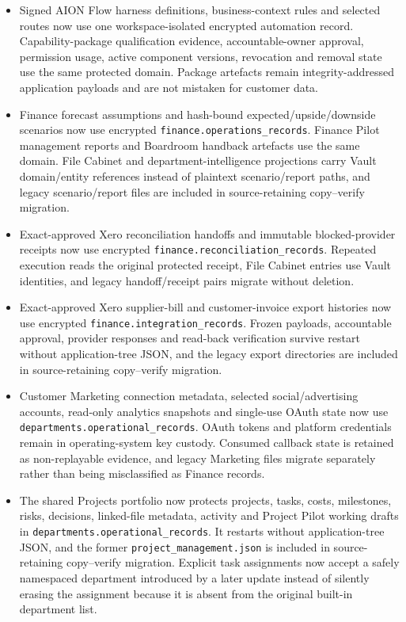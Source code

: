 \documentclass[11pt]{article}
\begin{document}
\begin{itemize}
  \item Signed AION Flow harness definitions, business-context rules and selected routes now use one workspace-isolated encrypted automation record. Capability-package qualification evidence, accountable-owner approval, permission usage, active component versions, revocation and removal state use the same protected domain. Package artefacts remain integrity-addressed application payloads and are not mistaken for customer data.
  \item Finance forecast assumptions and hash-bound expected/upside/downside scenarios now use encrypted \texttt{finance.operations\_records}. Finance Pilot management reports and Boardroom handback artefacts use the same domain. File Cabinet and department-intelligence projections carry Vault domain/entity references instead of plaintext scenario/report paths, and legacy scenario/report files are included in source-retaining copy--verify migration.
  \item Exact-approved Xero reconciliation handoffs and immutable blocked-provider receipts now use encrypted \texttt{finance.reconciliation\_records}. Repeated execution reads the original protected receipt, File Cabinet entries use Vault identities, and legacy handoff/receipt pairs migrate without deletion.
  \item Exact-approved Xero supplier-bill and customer-invoice export histories now use encrypted \texttt{finance.integration\_records}. Frozen payloads, accountable approval, provider responses and read-back verification survive restart without application-tree JSON, and the legacy export directories are included in source-retaining copy--verify migration.
  \item Customer Marketing connection metadata, selected social/advertising accounts, read-only analytics snapshots and single-use OAuth state now use \texttt{departments.operational\_records}. OAuth tokens and platform credentials remain in operating-system key custody. Consumed callback state is retained as non-replayable evidence, and legacy Marketing files migrate separately rather than being misclassified as Finance records.
  \item The shared Projects portfolio now protects projects, tasks, costs, milestones, risks, decisions, linked-file metadata, activity and Project Pilot working drafts in \texttt{departments.operational\_records}. It restarts without application-tree JSON, and the former \texttt{project\_management.json} is included in source-retaining copy--verify migration. Explicit task assignments now accept a safely namespaced department introduced by a later update instead of silently erasing the assignment because it is absent from the original built-in department list.

\end{itemize}
\end{document}
